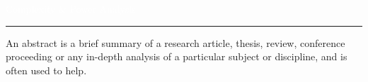 \begin{titlepage}
\BgThispage
{}
\noindent
\textcolor{white}{\bigsf Complexity \& Power Analysis}
\vspace*{2.5cm}\par
\noindent
\begin{minipage}{0.35\linewidth}
    \begin{flushright}
        \printauthor
    \end{flushright}
\end{minipage} \hspace{15pt}
%
\begin{minipage}{0.02\linewidth}
    \rule{2pt}{275pt}
\end{minipage} \hspace{-10pt}
%
\begin{minipage}{0.6\linewidth}
\vspace{5pt}

{\huge An abstract is a brief summary of a research article, thesis, review, conference proceeding or any in-depth analysis of a particular subject or discipline, and is often used to help.}

\end{minipage}
\end{titlepage}

\restoregeometry%
